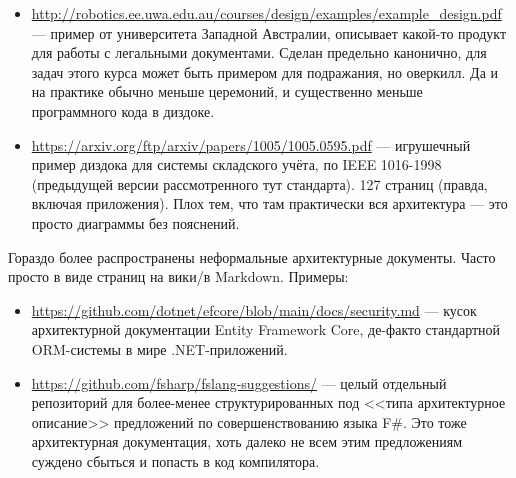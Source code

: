 \documentclass[a5paper]{article}
\begin{document}
\begin{itemize}
    \item \url{http://robotics.ee.uwa.edu.au/courses/design/examples/example_design.pdf} --- пример от университета Западной Австралии, описывает какой-то продукт для работы с легальными документами. Сделан предельно канонично, для задач этого курса может быть примером для подражания, но оверкилл. Да и на практике обычно меньше церемоний, и существенно меньше программного кода в диздоке.
    \item \url{https://arxiv.org/ftp/arxiv/papers/1005/1005.0595.pdf} --- игрушечный пример диздока для системы складского учёта, по IEEE 1016-1998 (предыдущей версии рассмотренного тут стандарта). 127 страниц (правда, включая приложения). Плох тем, что там практически вся архитектура --- это просто диаграммы без пояснений.
\end{itemize}

Гораздо более распространены неформальные архитектурные документы. Часто просто в виде страниц на вики/в Markdown. Примеры:

\begin{itemize}
    \item \url{https://github.com/dotnet/efcore/blob/main/docs/security.md} --- кусок архитектурной документации Entity Framework Core, де-факто стандартной ORM-системы в мире .NET-приложений.
    \item \url{https://github.com/fsharp/fslang-suggestions/} --- целый отдельный репозиторий для более-менее структурированных под <<типа архитектурное описание>> предложений по совершенствованию языка F\#. Это тоже архитектурная документация, хоть далеко не всем этим предложениям суждено сбыться и попасть в код компилятора.
\end{itemize}

\end{document}

